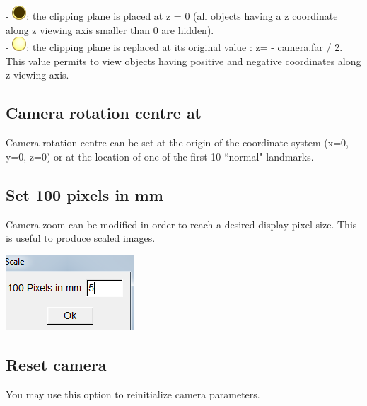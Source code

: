 \noindent
- \includegraphics[scale=0.7]{images/pixmap/Clipping_plane_z0.png}: the clipping plane is placed at z = 0 (all objects having a z coordinate along z viewing axis smaller than 0 are hidden).\\
\noindent- \includegraphics[scale=0.7]{images/pixmap/Clipping_plane_normal.png}: the clipping plane is replaced at its original value : z= - camera.far / 2. This value permits to view objects having positive and negative coordinates along z viewing axis.

\subsection{Camera rotation centre at}\label{camera_centre_at}



Camera rotation centre can be set at the origin of the coordinate system (x=0, y=0, z=0) or at the location of one of the first 10 ``normal" landmarks.

\subsection{Set 100 pixels in mm}

\noindent
\begin{minipage}{0.55\textwidth}
Camera zoom can be modified in order to reach a desired display pixel size. This is useful to produce scaled images.

\end{minipage}  
 \begin{minipage}{0.45\textwidth}\centering
  \includegraphics[scale=0.5]{images/Icons/100px_mm.png}

 \end{minipage} 
\noindent


\subsection{Reset camera}
You may use this option to reinitialize camera parameters.
